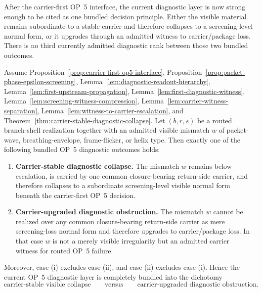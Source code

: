 \begin{remark}
After the carrier-first OP~5 interface, the current diagnostic layer is now strong enough to be cited as one bundled decision principle. Either the visible material remains subordinate to a stable carrier and therefore collapses to a screening-level normal form, or it upgrades through an admitted witness to carrier/package loss. There is no third currently admitted diagnostic rank between those two bundled outcomes.
\end{remark}

\begin{theorem}
\label{thm:bundled-op5-diagnostic-theorem}
Assume Proposition~\ref{prop:carrier-first-op5-interface}, Proposition~\ref{prop:packet-phase-epsilon-screening}, Lemma~\ref{lem:diagnostic-readout-hierarchy}, Lemma~\ref{lem:first-upstream-propagation}, Lemma~\ref{lem:first-diagnostic-witness}, Lemma~\ref{lem:screening-witness-compression}, Lemma~\ref{lem:carrier-witness-separation}, Lemma~\ref{lem:witness-to-carrier-escalation}, and Theorem~\ref{thm:carrier-stable-diagnostic-collapse}. Let $(b,r,s)$ be a routed branch-shell realization together with an admitted visible mismatch $w$ of packet-wave, breathing-envelope, frame-flicker, or helix type. Then exactly one of the following bundled OP~5 diagnostic outcomes holds:
\begin{enumerate}[leftmargin=2em,label=(\roman*)]
\item \textbf{Carrier-stable diagnostic collapse.} The mismatch $w$ remains below escalation, is carried by one common closure-bearing return-side carrier, and therefore collapses to a subordinate screening-level visible normal form beneath the carrier-first OP~5 decision.
\item \textbf{Carrier-upgraded diagnostic obstruction.} The mismatch $w$ cannot be realized over any common closure-bearing return-side carrier as mere screening-loss normal form and therefore upgrades to carrier/package loss. In that case $w$ is not a merely visible irregularity but an admitted carrier witness for routed OP~5 failure.
\end{enumerate}
Moreover, case \textup{(i)} excludes case \textup{(ii)}, and case \textup{(ii)} excludes case \textup{(i)}. Hence the current OP~5 diagnostic layer is completely bundled into the dichotomy
\[
\text{carrier-stable visible collapse}
\qquad\text{versus}\qquad
\text{carrier-upgraded diagnostic obstruction}.
\]
\end{theorem}

